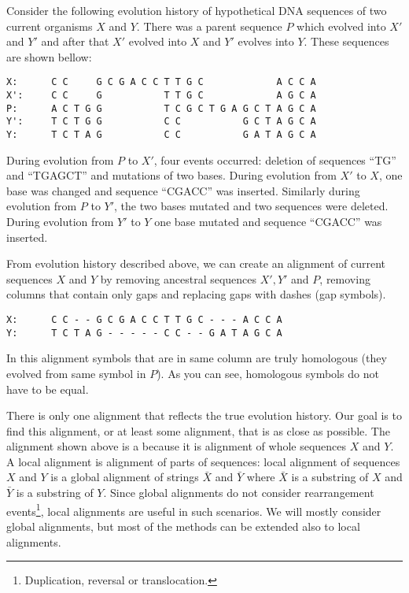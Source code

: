\begin{example} 
Consider the  following evolution history of hypothetical DNA sequences of two
current organisms $X$ and $Y$. There was a parent sequence $P$ which evolved into
$X'$ and $Y'$ and after that $X'$ evolved into $X$ and $Y'$ evolves into $Y$.
These sequences are shown bellow: 
\begin{verbatim}
X:      C C     G C G A C C T T G C             A C C A
X':     C C     G           T T G C             A G C A
P:      A C T G G           T C G C T G A G C T A G C A
Y':     T C T G G           C C           G C T A G C A
Y:      T C T A G           C C           G A T A G C A
\end{verbatim}
During evolution from $P$ to $X'$, four events occurred: deletion of 
sequences ``TG''  and ``TGAGCT'' and mutations of two bases. During evolution
from $X'$ to $X$, one base was changed and sequence ``CGACC'' was inserted.  
Similarly during evolution from $P$ to $Y'$, the two bases mutated and two
sequences were deleted. During evolution from $Y'$ to $Y$ one base mutated and
sequence ``CGACC'' was inserted. 

From evolution history described above, we can create an alignment of current
sequences $X$ and $Y$ by removing ancestral sequences $X',Y'$ and $P$, 
removing columns that contain only gaps and
replacing gaps with dashes (gap symbols). 
\begin{verbatim}
X:      C C - - G C G A C C T T G C - - - A C C A
Y:      T C T A G - - - - - C C - - G A T A G C A
\end{verbatim}
In this alignment symbols that are in same column are truly homologous (they
evolved from same symbol in $P$).
As you can see, homologous symbols do not have to be equal.
\end{example}

There is only one alignment that reflects the true evolution history. Our goal
is to find this alignment, or at least some alignment, that is as close as
possible. The alignment shown above is a  because it
is alignment of whole sequences $X$ and $Y$. A local alignment is alignment of
parts of sequences: local alignment of sequences $X$ and $Y$ is a global alignment
of strings $\bar{X}$ and $\bar{Y}$ where $\bar{X}$ is a substring of $X$ and
$\bar{Y}$ is a substring of $Y$.  Since global alignments do not consider
rearrangement events\footnote{Duplication, reversal or
translocation.}, local alignments are useful in such scenarios.  We will mostly
consider global alignments, but most of the methods can be extended also to local
alignments.

